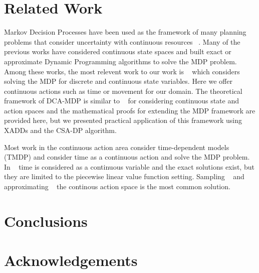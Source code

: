 \documentclass[letterpaper]{article}
\begin{document}
\section{Related Work}
Markov Decision Processes have been used as the framework of many planning problems that consider uncertainty with continuous resources ~\cite{bresina02}. Many of the previous works have considered continuous state spaces and built exact or approximate Dynamic Programming algorithms to solve the MDP problem. Among these works, the most relevent work to our work is ~\cite{sanner11} which considers solving the MDP for discrete and continuous state variables. 
Here we offer continuous actions such as time or movement for our domain. The theoretical framework of DCA-MDP is similar to ~\cite{Rachelson08} for considering continuous state and action spaces and the mathematical proofs for extending the MDP framework are provided here, but we presented practical application of this framework using XADDs and the CSA-DP algorithm. 

Most work in the continuous action area consider time-dependent models (TMDP) and consider time as a continuous action and solve the MDP problem. In ~\cite{boyan00} time is considered as a continuous variable and the exact solutions exist, but they are limited to the piecewise linear value function setting. 
Sampling ~\cite{Weinstein2010} and approximating ~\cite{pegasus} the continous action space is the most common solution. 

\section{Conclusions}



\section*{Acknowledgements}




\end{document}
